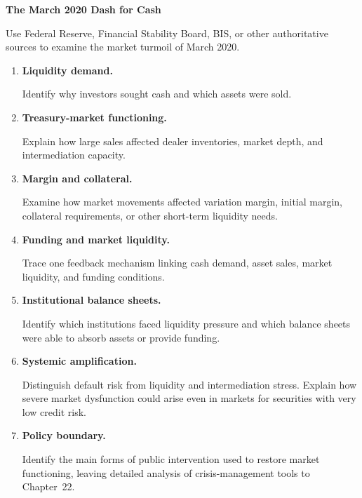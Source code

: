 

\textbf{The March 2020 Dash for Cash}

Use Federal Reserve, Financial Stability Board, BIS, or other authoritative sources to examine the market turmoil of March 2020.

\begin{enumerate}

\item \textbf{Liquidity demand.}

Identify why investors sought cash and which assets were sold.

\item \textbf{Treasury-market functioning.}

Explain how large sales affected dealer inventories, market depth, and intermediation capacity.

\item \textbf{Margin and collateral.}

Examine how market movements affected variation margin, initial margin, collateral requirements, or other short-term liquidity needs.

\item \textbf{Funding and market liquidity.}

Trace one feedback mechanism linking cash demand, asset sales, market liquidity, and funding conditions.

\item \textbf{Institutional balance sheets.}

Identify which institutions faced liquidity pressure and which balance sheets were able to absorb assets or provide funding.

\item \textbf{Systemic amplification.}

Distinguish default risk from liquidity and intermediation stress. Explain how severe market dysfunction could arise even in markets for securities with very low credit risk.

\item \textbf{Policy boundary.}

Identify the main forms of public intervention used to restore market functioning, leaving detailed analysis of crisis-management tools to Chapter~22.

\end{enumerate}

